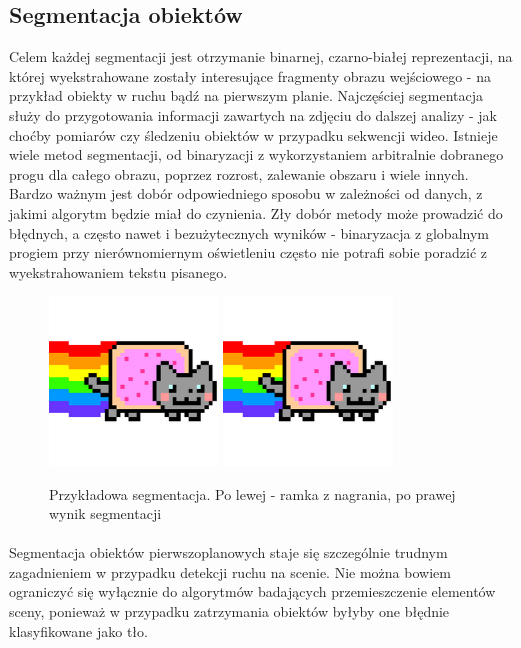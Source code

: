 \subsection{Segmentacja obiektów}
Celem każdej segmentacji jest otrzymanie binarnej, czarno-białej reprezentacji, na której wyekstrahowane zostały interesujące fragmenty obrazu wejściowego - na przykład obiekty w ruchu bądź na pierwszym planie. Najczęściej segmentacja służy do przygotowania informacji zawartych na zdjęciu do dalszej analizy - jak choćby pomiarów czy śledzeniu obiektów w przypadku sekwencji wideo. Istnieje wiele metod segmentacji, od binaryzacji z wykorzystaniem arbitralnie dobranego progu dla całego obrazu, poprzez rozrost, zalewanie obszaru i wiele innych. Bardzo ważnym jest dobór odpowiedniego sposobu w zależności od danych, z jakimi algorytm będzie miał do czynienia. Zły dobór metody może prowadzić do błędnych, a często nawet i bezużytecznych wyników - binaryzacja z globalnym progiem przy nierównomiernym oświetleniu często nie potrafi sobie poradzić z wyekstrahowaniem tekstu pisanego.
\begin{figure}[!htb]
\centering

\includegraphics[width=0.4\textwidth]{img/sample}
\includegraphics[width=0.4\textwidth]{img/sample}
\caption{Przykładowa segmentacja. Po lewej - ramka z nagrania, po prawej wynik segmentacji}
\end{figure}

\paragraph{}
Segmentacja obiektów pierwszoplanowych staje się szczególnie trudnym zagadnieniem w przypadku detekcji ruchu na scenie. Nie można bowiem ograniczyć się wyłącznie do algorytmów badających przemieszczenie elementów sceny, ponieważ w przypadku zatrzymania obiektów byłyby one błędnie klasyfikowane jako tło. 
